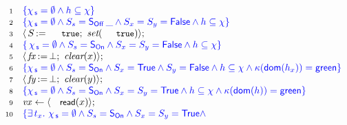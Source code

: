 \documentclass[a4paper,UKenglish]{lipics-v2016}
\newcommand{\asgn}{\leftarrow}
\newcommand{\ie}{\emph{i.e.}\xspace}
\newcommand{\dom}[1]{\mathsf{dom}(#1)}
\newcommand{\specK}[1]{\ensuremath{\textcolor{blue}{#1}}}
\newcommand{\act}[1]{\textsf{\small{#1}}}
\newcommand{\aux}[1]{\textit{#1}}
\newcommand{\esc}[1]{\text{\texttt{\small{#1}}}}
\newcommand{\selfsub}{\mathsf{s}}
\newcommand{\hist}{\chi}
\newcommand{\histS}{\hist_{\, \selfsub}}
\newcommand{\hempty}{\emptyset}
\newcommand{\ldot}{\mathord{.}\,}
\def\FF{\mathsf{False}}
\def\TT{\mathsf{True}}
\newcommand{\C}{\kappa}
\newcommand{\stableorder}{\Omega}
\newcommand{\sOn}{\mathsf{S_{On}}}
\newcommand{\sOff}{\mathsf{S_{Off}}}
\newcommand{\var}[1]{\mathit{#1}}
\newcommand{\num}[1]{{\text{{\scriptsize{#1}}}}}
\def\lat{\langle}
\def\rat{\rangle}
\def\tbnd{\asgn}
\newcommand{\actwrite}[2]{{#1}\,{:=}\,{#2}}
\theoremstyle{definition}
\begin{document}



%

\begin{figure}[!htp]
\[
  \begin{array}[t]{r l}
  \num{1} & \specK{\{ \histS = \hempty \wedge h \subseteq \hist \}} \\
  \num{2} & \specK{\{ \histS = \hempty \wedge
                \sss = \sOff\, \_ \wedge \sx = \sy = \FF
                \wedge h \subseteq \hist\}}\\
  \num{3} & \lat\,\actwrite{\s}{\esc{true}};\ \aux{set}(\esc{true}) \rat;\\
  \num{4} & \specK{\{\, \histS = \hempty \wedge
              \sss = \sOn \wedge \sx = \sy = \FF \wedge
              h \subseteq \hist \}}\\
  \num{5} & \lat\,\actwrite{\var{\fx}}{\bot};\ \aux{clear}(x)\rat;\\
  \num{6} & \specK{\{
                 \histS = \hempty \wedge \sss= \sOn \wedge \sx = \TT
                 \wedge \sy = \FF \wedge
               h \subseteq \hist \wedge
               \C(\dom{h_{x}}) = \mathsf{green}\}}\\
  \num{7} & \lat\,\actwrite{\var{\fy}}{\bot};\ \aux{clear}(y)\rat;\\
  \num{8} & \specK{\{\histS = \hempty \wedge \sss= \sOn \wedge
             \sx = \sy = \TT \wedge
             h \subseteq \hist \wedge \C(\dom{h}) = \mathsf{green}\}}\\
  \num{9} & \var{vx} \tbnd \lat \act{read}(x) \rat;\\
  \num{10} & \specK{\{ \exists\, t_x\ldot\, \histS = \hempty \wedge
                  \sss = \sOn \wedge \sx = \sy = \TT  \wedge}\\
           & \specK{\hphantom{\{ \exists\, t_x\ldot}
}
\end{array}\]
\end{figure}
\end{document}
